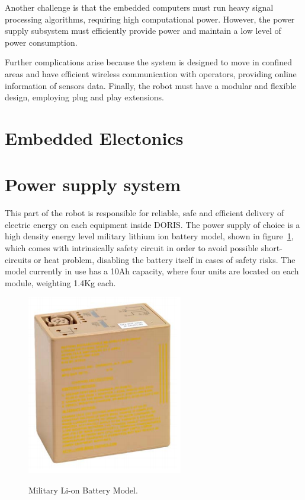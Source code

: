 \documentclass{ifacconf}
\begin{document}

Another challenge is that the embedded computers must run heavy signal
processing algorithms, requiring high computational power. However, the power
supply subsystem must efficiently provide power and maintain a low level of
power consumption.

Further complications arise because the system is designed to move in confined
areas and have efficient wireless communication with operators, providing
online information of sensors data. Finally, the robot must have a modular and
flexible design, employing plug and play extensions.%




\section{Embedded Electonics}\label{sec:electronics_overview}

\section{Power supply system}\label{sec:powersupply_overview}
This part of the robot is responsible for reliable, safe and efficient delivery
of electric energy on each equipment inside DORIS. The power supply of choice
is a high density energy level military lithium ion battery model, shown in 
figure~\ref{fig:bat}, which comes with intrinsically safety circuit in order to
avoid possible short-circuits or heat problem, disabling the battery itself in
cases of safety risks. The model currently in use has a 10Ah capacity, where
four units are located on each module, weighting 1.4Kg each.

\begin{figure}[ht]
\centering
    \includegraphics[width=0.5\columnwidth]{figs/bateria.png}  %
    \label{fig:bat}
\caption{Military Li-on Battery Model.}\vspace{-0.25cm}
\end{figure}
\end{document}
